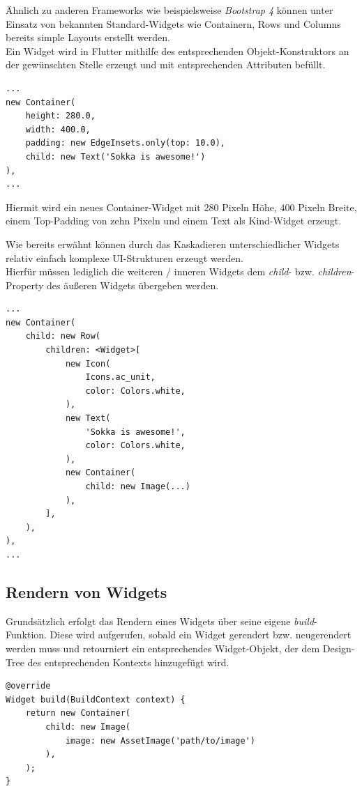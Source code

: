 Ähnlich zu anderen Frameworks wie beispielsweise \textit{Bootstrap 4}
können unter Einsatz von bekannten Standard-Widgets wie Containern, Rows und Columns
bereits simple Layouts erstellt werden.\\

Ein Widget wird in Flutter mithilfe des entsprechenden Objekt-Konstruktors
an der gewünschten Stelle erzeugt und mit entsprechenden Attributen befüllt.

\begin{lstlisting}
...
new Container(
    height: 280.0,
    width: 400.0,
    padding: new EdgeInsets.only(top: 10.0),
    child: new Text('Sokka is awesome!')
),
...
\end{lstlisting}

Hiermit wird ein neues Container-Widget mit 280 Pixeln Höhe,
400 Pixeln Breite, einem Top-Padding von zehn Pixeln und einem Text als
Kind-Widget erzeugt.

Wie bereits erwähnt können durch das Kaskadieren unterschiedlicher Widgets
relativ einfach komplexe UI-Strukturen erzeugt werden.\\
Hierfür müssen lediglich die weiteren / inneren Widgets dem 
\textit{child}- bzw. \textit{children}-Property des äußeren Widgets übergeben werden.
\pagebreak
\begin{lstlisting}
...
new Container(
    child: new Row(
        children: <Widget>[
            new Icon(
                Icons.ac_unit,
                color: Colors.white,
            ),
            new Text(
                'Sokka is awesome!',
                color: Colors.white,
            ),
            new Container(
                child: new Image(...)
            ),
        ],
    ),
),
...
\end{lstlisting}


\subsection{Rendern von Widgets}

Grundsätzlich erfolgt das Rendern eines Widgets über seine eigene \textit{build}-Funktion. Diese wird aufgerufen,
sobald ein Widget gerendert bzw. neugerendert werden muss und retourniert ein entsprechendes Widget-Objekt,
der dem Design-Tree des entsprechenden Kontexts hinzugefügt wird.

\begin{lstlisting}
@override
Widget build(BuildContext context) {
    return new Container(
        child: new Image(
            image: new AssetImage('path/to/image')
        ),
    );
}
\end{lstlisting}

